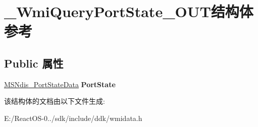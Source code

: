 \hypertarget{struct___wmi_query_port_state___o_u_t}{}\section{\+\_\+\+Wmi\+Query\+Port\+State\+\_\+\+O\+U\+T结构体 参考}
\label{struct___wmi_query_port_state___o_u_t}
\subsection*{Public 属性}
\begin{DoxyCompactItemize}
\item 
\mbox{\label{struct___wmi_query_port_state___o_u_t_a8d26b2afa18589f297e0a0db13b8b8d1}} 
\hyperlink{struct___m_s_ndis___port_state_data}{M\+S\+Ndis\+\_\+\+Port\+State\+Data} {\bfseries Port\+State}
\end{DoxyCompactItemize}


该结构体的文档由以下文件生成\+:\begin{DoxyCompactItemize}
\item 
E\+:/\+React\+O\+S-\/0../sdk/include/ddk/wmidata.\+h\end{DoxyCompactItemize}
